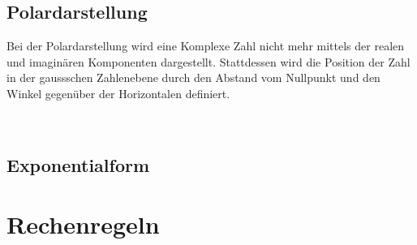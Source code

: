 \subsection{Polardarstellung}
Bei der Polardarstellung wird eine Komplexe Zahl nicht mehr mittels der realen 
und imaginären Komponenten dargestellt. Stattdessen wird die Position der Zahl 
in der gaussschen Zahlenebene durch den Abstand vom Nullpunkt und den Winkel 
gegenüber der Horizontalen definiert. 
\\
\\

\subsection{Exponentialform}


\section{Rechenregeln}

